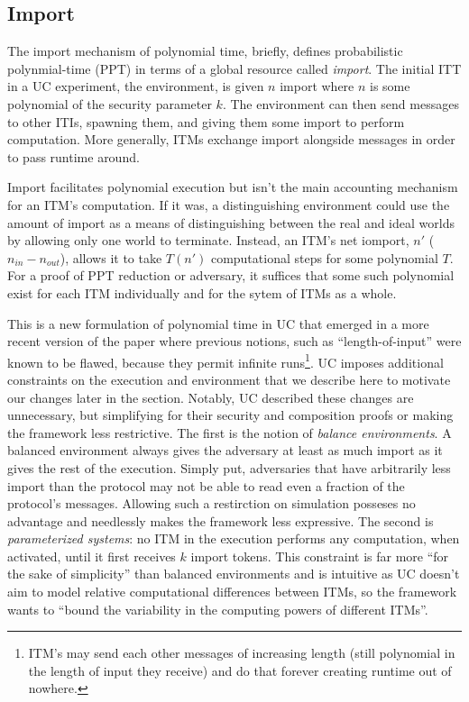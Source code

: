 \subsection{Import}
The import mechanism of polynomial time, briefly, defines probabilistic polynmial-time (PPT) in terms of a global resource called \emph{import}.
The initial ITT in a UC experiment, the environment, is given $n$ import where $n$ is some polynomial of the security parameter $k$. 
The environment can then send messages to other ITIs, spawning them, and giving them some import to perform computation.
More generally, ITMs exchange import alongside messages in order to pass runtime around.

Import facilitates polynomial execution but isn't the main accounting mechanism for an ITM's computation.
If it was, a distinguishing environment could use the amount of import as a means of distinguishing between the real and ideal worlds by allowing only one world to terminate.
Instead, an ITM's net iomport, $n'$ ($n_{in} - n_{out}$), allows it to take $T(n')$ computational steps for some polynomial $T$. 
For a proof of PPT reduction or adversary, it suffices that some such polynomial exist for each ITM individually and for the sytem of ITMs as a whole.

This is a new formulation of polynomial time in UC that emerged in a more recent version of the paper where previous notions, such as ``length-of-input'' were known to be flawed, because they permit infinite runs\footnote{ITM's may send each other messages of increasing length (still polynomial in the length of input they receive) and do that forever creating runtime out of nowhere.}.
UC imposes additional constraints on the execution and environment that we describe here to motivate our changes later in the section.
Notably, UC described these changes are unnecessary, but simplifying for their security and composition proofs or making the framework less restrictive. 
The first is the notion of \emph{balance environments}. 
A balanced environment always gives the adversary at least as much import as it gives the rest of the execution.
Simply put, adversaries that have arbitrarily less import than the protocol may not be able to read even a fraction of the protocol's messages. 
Allowing such a restirction on simulation posseses no advantage and needlessly makes the framework less expressive.
The second is \emph{parameterized systems}: no ITM in the execution performs any computation, when activated, until it first receives $k$ import tokens.
This constraint is far more ``for the sake of simplicity'' than balanced environments and is intuitive as UC doesn't aim to model relative computational differences between ITMs, so the framework wants to ``bound the variability in the computing powers of different ITMs''.


